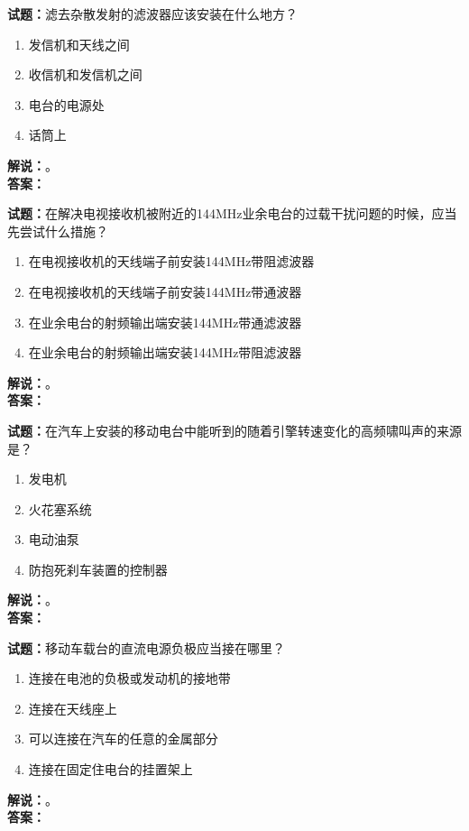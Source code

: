 \documentclass{ctexbook}
\begin{document}
\vspace{\baselineskip}

\noindent\textbf{试题：}滤去杂散发射的滤波器应该安装在什么地方？
\begin{enumerate}[leftmargin=3em]
  \item 发信机和天线之间
  \item 收信机和发信机之间
  \item 电台的电源处
  \item 话筒上
\end{enumerate}
\noindent\textbf{解说：}\textbf{}。\\\noindent\textbf{答案：}

\vspace{\baselineskip}

\noindent\textbf{试题：}在解决电视接收机被附近的144\unit{\MHz}业余电台的过载干扰问题的时候，应当先尝试什么措施？
\begin{enumerate}[leftmargin=3em]
  \item 在电视接收机的天线端子前安装144\unit{\MHz}带阻滤波器
  \item 在电视接收机的天线端子前安装144\unit{\MHz}带通波器
  \item 在业余电台的射频输出端安装144\unit{\MHz}带通滤波器
  \item 在业余电台的射频输出端安装144\unit{\MHz}带阻滤波器
\end{enumerate}
\noindent\textbf{解说：}\textbf{}。\\\noindent\textbf{答案：}

\vspace{\baselineskip}

\noindent\textbf{试题：}在汽车上安装的移动电台中能听到的随着引擎转速变化的高频啸叫声的来源是？
\begin{enumerate}[leftmargin=3em]
  \item 发电机
  \item 火花塞系统
  \item 电动油泵
  \item 防抱死刹车装置的控制器
\end{enumerate}
\noindent\textbf{解说：}\textbf{}。\\\noindent\textbf{答案：}

\vspace{\baselineskip}

\noindent\textbf{试题：}移动车载台的直流电源负极应当接在哪里？
\begin{enumerate}[leftmargin=3em]
  \item 连接在电池的负极或发动机的接地带
  \item 连接在天线座上
  \item 可以连接在汽车的任意的金属部分
  \item 连接在固定住电台的挂置架上
\end{enumerate}
\noindent\textbf{解说：}\textbf{}。\\\noindent\textbf{答案：}
\end{document}
